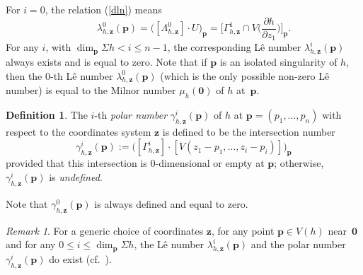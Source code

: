 \documentclass[a4paper,fleqn,11pt]{amsart}
\theoremstyle{definition}
\newtheorem{definition}[theorem]{Definition}
\theoremstyle{remark}
\newtheorem{remark}[theorem]{Remark}
\numberwithin{equation}{section}
\begin{document}
For $i=0$, the relation (\ref{dln}) means
\begin{equation*}
\qquad
\lambda^0_{h,\mathbf{z}}(\mathbf{p}) = \big([\Lambda^0_{h,\mathbf{z}}]\cdot U \big)_\mathbf{p} = \bigg[\Gamma_{h,\mathbf{z}}^{1}\cap V\bigg(\frac{\partial h}{\partial z_{1}}\bigg)\bigg]_\mathbf{p}.
\end{equation*}
For any $i$, with $\dim_\mathbf{p}\Sigma h < i\leq n-1$, the corresponding L\^e number $\lambda^i_{h,\mathbf{z}}(\mathbf{p})$ always exists and is equal to zero. 
Note that if $\mathbf{p}$ is an isolated singularity of $h$, then the $0$-th L\^e number $\lambda^0_{h,\mathbf{z}}(\mathbf{p})$ (which is the only possible non-zero L\^e number) is equal to the Milnor number $\mu_h(\mathbf{0})$ of $h$ at~$\mathbf{p}$.

\begin{definition}
The $i$-th \emph{polar number} $\gamma^i_{h,\mathbf{z}}(\mathbf{p})$ of $h$ at $\mathbf{p}=(p_1,\ldots,p_n)$ with respect to the coordinates system $\mathbf{z}$ is defined to be the intersection number
\begin{equation*}
\gamma^i_{h,\mathbf{z}}(\mathbf{p}):=\big([\Gamma^i_{h,\mathbf{z}}]\cdot [V(z_1-p_1,\ldots,z_i-p_i)]\big)_\mathbf{p}
\end{equation*}
provided that this intersection is $0$-dimensional or empty at $\mathbf{p}$; otherwise, $\gamma^i_{h,\mathbf{z}}(\mathbf{p})$ is \emph{undefined}.
\end{definition}

Note that $\gamma^0_{h,\mathbf{z}}(\mathbf{p})$ is always defined and equal to zero. 

\begin{remark}
For a generic choice of coordinates $\mathbf{z}$, for any point $\mathbf{p}\in V(h)$ near~$\mathbf{0}$ and for any $0\leq i\leq \dim_{\mathbf{p}}\Sigma h$, the L\^e number $\lambda^i_{h,\mathbf{z}}(\mathbf{p})$ and the polar number $\gamma^i_{h,\mathbf{z}}(\mathbf{p})$ do exist (cf.~\cite[Proposition 10.2 and Theorem 1.28]{M}).
\end{remark}
\end{document}

